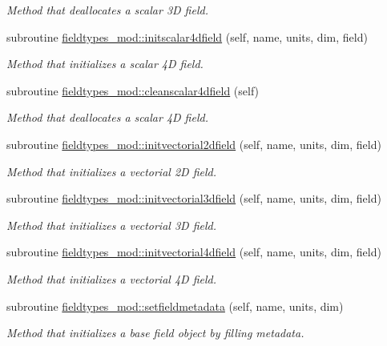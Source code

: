 \begin{DoxyCompactItemize}
\begin{DoxyCompactList}\small\item\em Method that deallocates a scalar 3D field. \end{DoxyCompactList}\item 
subroutine \mbox{\hyperlink{namespacefieldtypes__mod_a21dba84bb8fdb02d8bf5fd0052b51283}{fieldtypes\+\_\+mod\+::initscalar4dfield}} (self, name, units, dim, field)
\begin{DoxyCompactList}\small\item\em Method that initializes a scalar 4D field. \end{DoxyCompactList}\item 
subroutine \mbox{\hyperlink{namespacefieldtypes__mod_aaabae216913c347395d5e19ea2c22286}{fieldtypes\+\_\+mod\+::cleanscalar4dfield}} (self)
\begin{DoxyCompactList}\small\item\em Method that deallocates a scalar 4D field. \end{DoxyCompactList}\item 
subroutine \mbox{\hyperlink{namespacefieldtypes__mod_ac3e3d9aabba3893d61583e890e3bdf41}{fieldtypes\+\_\+mod\+::initvectorial2dfield}} (self, name, units, dim, field)
\begin{DoxyCompactList}\small\item\em Method that initializes a vectorial 2D field. \end{DoxyCompactList}\item 
subroutine \mbox{\hyperlink{namespacefieldtypes__mod_a20d935cfa1513350667d04f969be5e26}{fieldtypes\+\_\+mod\+::initvectorial3dfield}} (self, name, units, dim, field)
\begin{DoxyCompactList}\small\item\em Method that initializes a vectorial 3D field. \end{DoxyCompactList}\item 
subroutine \mbox{\hyperlink{namespacefieldtypes__mod_ad458710e4a2d6c40a3dfa7f19481cd5a}{fieldtypes\+\_\+mod\+::initvectorial4dfield}} (self, name, units, dim, field)
\begin{DoxyCompactList}\small\item\em Method that initializes a vectorial 4D field. \end{DoxyCompactList}\item 
subroutine \mbox{\hyperlink{namespacefieldtypes__mod_abc601ce9f8a974f426e876cc4c02e2a2}{fieldtypes\+\_\+mod\+::setfieldmetadata}} (self, name, units, dim)
\begin{DoxyCompactList}\small\item\em Method that initializes a base field object by filling metadata. \end{DoxyCompactList}\item 

\end{DoxyCompactItemize}
